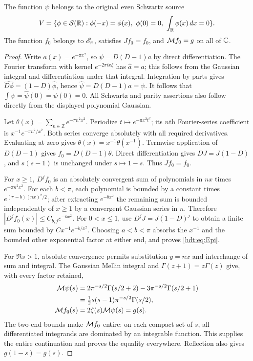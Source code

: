 \begin{hdtlemma}\label{hdt:lem:theta-source}
The function $\psi$ belongs to the original even Schwartz source
\[
V=\{\phi\in\hdtSch(\hdtR):\phi(-x)=\phi(x),\ \phi(0)=0,
\ \int_\hdtR\phi(x)\,dx=0\}.
\]
The function $f_0$ belongs to $\mathscr E_\pi$, satisfies $Jf_0=f_0$, and
$\mathcal M f_0=g$ on all of $\mathbb C$.
\end{hdtlemma}
\begin{proof}
Write $a(x)=e^{-\pi x^2}$, so $\psi=D(D-1)a$ by direct
differentiation. The Fourier transform with kernel $e^{-2\pi ix\xi}$
has $\widehat a=a$; this follows from the Gaussian integral and
differentiation under that integral. Integration by parts gives
$\widehat{D\phi}=(1-D)\widehat\phi$, hence
$\widehat\psi=D(D-1)a=\psi$. It follows that
$\int\psi=\widehat\psi(0)=\psi(0)=0$. All Schwartz and parity
assertions also follow directly from the displayed polynomial Gaussian.

Let $\theta(x)=\sum_{n\in\mathbb Z}e^{-\pi n^2x^2}$.
Periodize $t\mapsto e^{-\pi x^2t^2}$; its $n$th Fourier-series
coefficient is $x^{-1}e^{-\pi n^2/x^2}$. Both series converge
absolutely with all required derivatives. Evaluating at zero gives
$\theta(x)=x^{-1}\theta(x^{-1})$. Termwise application of
$D(D-1)$ gives $f_0=D(D-1)\theta$. Direct differentiation gives
$DJ=J(1-D)$, and $s(s-1)$ is unchanged under $s\mapsto1-s$.
Thus $Jf_0=f_0$.

For $x\geq1$, $D^jf_0$ is an absolutely convergent sum of
polynomials in $nx$ times $e^{-\pi n^2x^2}$. For each $b<\pi$,
each polynomial is bounded by a constant times
$e^{(\pi-b)(nx)^2/2}$; after extracting $e^{-bx^2}$ the
remaining sum is bounded independently of $x\geq1$ by a convergent
Gaussian series in $n$. Therefore $|D^jf_0(x)|\leq C_{b,j}e^{-bx^2}$.
For $0<x\leq1$, use $D^jJ=J(1-D)^j$ to obtain a finite sum
bounded by $Cx^{-1}e^{-b/x^2}$. Choosing $a<b<\pi$ absorbs
the $x^{-1}$ and the bounded other exponential factor at either end,
and proves \eqref{hdt:eq:Epi}.

For $\Re s>1$, absolute convergence permits substitution $y=nx$
and interchange of sum and integral. The Gaussian Mellin integral
and $\Gamma(z+1)=z\Gamma(z)$ give, with every factor retained,
\[
\begin{split}
\mathcal M\psi(s)
&=2\pi^{-s/2}\Gamma(s/2+2)-3\pi^{-s/2}\Gamma(s/2+1)\\
&=\tfrac12s(s-1)\pi^{-s/2}\Gamma(s/2),\\
\mathcal M f_0(s)&=2\zeta(s)\mathcal M\psi(s)=g(s).
\end{split}
\]
The two-end bounds make $\mathcal M f_0$ entire: on each compact
set of $s$, all differentiated integrands are dominated by an
integrable function. This supplies the entire continuation and proves
the equality everywhere. Reflection also gives $g(1-s)=g(s)$.
\end{proof}


